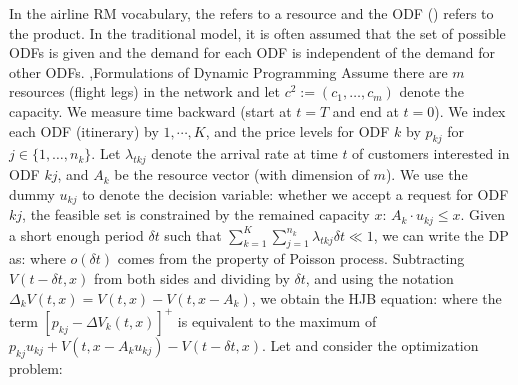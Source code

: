 \documentclass[12pt]{report}
\begin{document}
In the airline RM vocabulary, the  refers to a resource and the ODF () refers to the product. In the traditional model, it is often assumed that
the set of possible ODFs is given and the demand for each ODF is independent of the demand for other ODFs.
\sep{Formulations of Dynamic Programming}
Assume there are $m$ resources (flight legs) in the network and let $c^2:=(c_1,\ldots,c_m)$ denote the capacity. We measure time backward (start at $t=T$ and end at $t=0$).
We index each ODF (itinerary) by $1,\cdots, K$, and the price levels for ODF $k$ by $p_{kj}$ for $j\in\{1,\ldots,n_k\}$. Let $\lambda_{tkj}$ denote the
arrival rate at time $t$ of customers interested in ODF $kj$, and $A_k$ be the resource vector (with dimension of $m$). We use the dummy $u_{kj}$ to denote the decision variable: whether we
accept a request for ODF $kj$, the feasible set is constrained by the remained capacity $x$: $A_k \cdot u_{kj} \le x$. Given a short enough period $\delta t$ such that $\sum_{k=1}^K\sum_{j=1}^{n_k}\lambda_{tkj}\delta t \ll 1$, we can write the DP as:
where $o(\delta t)$ comes from the property of Poisson process. Subtracting $V(t-\delta t,x)$ from both sides and dividing by $\delta t$, and using the notation
$\Delta_kV(t,x)=V(t,x)-V(t,x-A_k)$, we obtain the HJB equation:
where the term $[p_{kj}-\Delta V_k(t,x)]^+$ is equivalent to the maximum of $p_{kj}u_{kj}+V(t,x-A_ku_{kj})-V(t-\delta t,x)$. Let
and consider the optimization problem:
\end{document}
